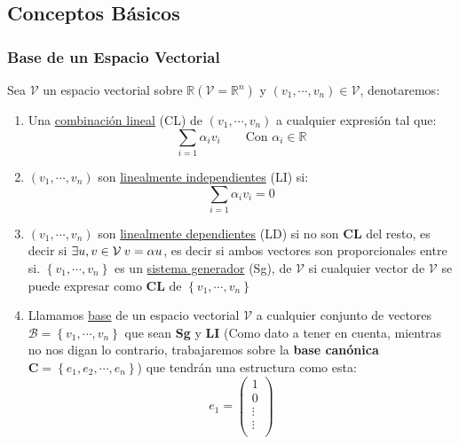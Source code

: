 \subsection{Conceptos Básicos}
\subsubsection{Base de un Espacio Vectorial}
Sea \(\mathcal{V}\) un espacio vectorial sobre \(\mathbb{R} \left(\mathcal{V} = \mathbb{R}^n\right) \) y \(\left(v_1,\cdots,v_n\right) \in \mathcal{V} \), denotaremos:
\begin{enumerate}
        \item  Una \underline{combinación lineal} (CL) de \(\left(v_1,\cdots,v_n\right)\) a cualquier expresión tal que:
              \[
                      \sum_{i=1}\alpha_i v_i \hspace{2em} \text{Con } \alpha_i \in \mathbb{R}
              \]
        \item  \(\left(v_1,\cdots,v_n\right)\) son \underline{linealmente independientes} (LI) si:
              \[
                      \sum_{i=1}\alpha_i v_i = 0
              \]
        \item  \(\left(v_1,\cdots,v_n\right)\) son \underline{linealmente dependientes} (LD) si no son \textbf{CL} del resto, es decir si \(\exists u,v \in \mathcal{V} \hspace{.25em} v = \alpha u\), es decir si ambos vectores son proporcionales entre si.
              \(\left\{v_1,\cdots,v_n\right\} \) es un \underline{sistema generador} (Sg), de \(\mathcal{V}\) si cualquier vector de \(\mathcal{V}\) se puede expresar como \textbf{CL} de \(\left\{v_1,\cdots,v_n\right\} \)
        \item  Llamamos \underline{base} de un espacio vectorial \(\mathcal{V}\) a cualquier conjunto de vectores \(\mathcal{B} = \left\{v_1,\cdots, v_n\right\} \) que sean \textbf{Sg} y \textbf{LI} (Como dato a tener en cuenta, mientras no nos digan lo contrario, trabajaremos sobre la \textbf{base canónica} \(\mathbf{C} = \left\{e_1,e_2,\cdots, e_n\right\} \)) que tendrán una estructura como esta:
              \[
                      e_1 =\begin{pmatrix}
                              1      \\
                              0      \\
                              \vdots \\
                              \vdots \\
                      \end{pmatrix}
\]
\end{enumerate}
